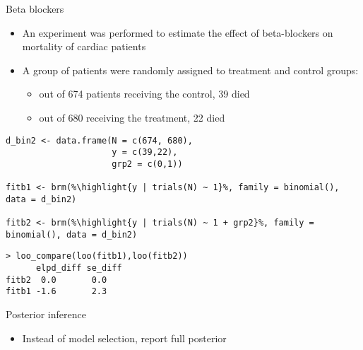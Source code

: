 \documentclass[english,t]{beamer}
\newcommand{\reducedstrut}{\vrule width 0pt height .9\ht\strutbox depth .9\dp\strutbox\relax}
\newcommand{\highlight}[1]{%
  \begingroup
  \setlength{\fboxsep}{0pt}%
  \colorbox{yellow!30}{\reducedstrut\detokenize{#1}\/}%
  \endgroup
}
\begin{document}
\begin{frame}[fragile]{Beta blockers}

\begin{itemize}
  \item An experiment was performed to estimate the effect of
    beta-blockers on mortality of cardiac patients
  \item A group of
    patients were randomly assigned to treatment and control groups:
    \begin{itemize}
    \item out of 674 patients receiving the control, 39 died
    \item out of 680 receiving the treatment, 22 died
    \end{itemize}
  \end{itemize}

\begin{verbatim}
d_bin2 <- data.frame(N = c(674, 680),
                     y = c(39,22),
                     grp2 = c(0,1))

fitb1 <- brm(%\highlight{y | trials(N) ~ 1}%, family = binomial(), data = d_bin2)

fitb2 <- brm(%\highlight{y | trials(N) ~ 1 + grp2}%, family = binomial(), data = d_bin2)
\end{verbatim}
  \pause
\begin{verbatim}
> loo_compare(loo(fitb1),loo(fitb2))
      elpd_diff se_diff
fitb2  0.0       0.0   
fitb1 -1.6       2.3   
\end{verbatim}
\end{frame}

\begin{frame}{Posterior inference}

  \begin{itemize}
  \item Instead of model selection, report full posterior 
    \begin{itemize}
    \end{itemize}
  \end{itemize}
  
  
\end{frame}
\end{document}
